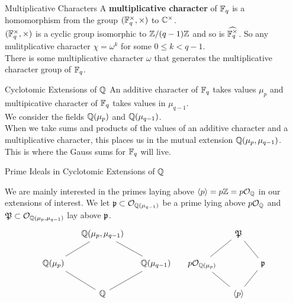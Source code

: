 \documentclass[presentation]{beamer}
\begin{document}
\begin{frame}{Multiplicative Characters}
A \textbf{multiplicative character} of $\mathbb{F}_q$ is a homomorphism from the group $(\mathbb{F}_q^\times, \times)$ to $\mathbb{C}^\times$. 
\\


$(\mathbb{F}_q^\times, \times)$ is a cyclic group isomorphic to $\mathbb{Z}/(q - 1)\mathbb{Z}$ and so is $\widehat{\mathbb{F}_q^\times}$. So any mulitplicative character $\chi = \omega^k$ for some $0 \leq k < q-1$.
\\


There is some multiplicative character $\omega$ that generates the multiplicative character group of $\mathbb{F}_q$.

\end{frame}

\begin{frame}{Cyclotomic Extensions of $\mathbb{Q}$}
An additive character of $\mathbb{F}_q$ takes values $\mu_p$ and multipicative character of $\mathbb{F}_q$ takes values in $\mu_{q-1}$.\\

We consider the fields $\mathbb{Q}(\mu_p)$ and $\mathbb{Q}(\mu_{q-1})$.
\\

When we take sums and products of the values of an additive character and a multiplicative character, this places us in the mutual extension $\mathbb{Q}(\mu_p, \mu_{q-1})$. 
\\
This is where the Gauss sums for $\mathbb{F}_q$ will live.


\end{frame}

\begin{frame}{Prime Ideals in Cyclotomic Extensions of $\mathbb{Q}$}

We are mainly interested in the primes laying above $\langle p \rangle = p\mathbb{Z} = p \mathcal{O}_{\mathbb{Q}}$ in our extensions of interest. We let $\mathfrak{p} \subset \mathcal{O}_{\mathbb{Q}(\mu_{q-1})}$ be a prime lying above $p\mathcal{O}_{\mathbb{Q}}$ and $\mathfrak{P} \subset \mathcal{O}_{\mathbb{Q}(\mu_p, \mu_{q-1})}$ lay above $\mathfrak{p}$.
\[\begin{tikzcd}[ampersand replacement=\&, column sep=small]
	\& {\mathbb{Q}(\mu_p,\mu_{q-1})} \&\&\& {\mathfrak{P}} \\
	{\mathbb{Q}(\mu_p)} \&\& {\mathbb{Q}(\mu_{q-1})} \& {p\mathcal{O}_{\mathbb{Q}(\mu_p)}} \&\& {\mathfrak{p}} \\
	\& {\mathbb{Q}} \&\&\& {\langle p \rangle}
	\arrow[no head, from=3-2, to=2-3]
	\arrow[no head, from=3-2, to=2-1]
	\arrow[no head, from=2-3, to=1-2]
	\arrow[no head, from=2-1, to=1-2]
	\arrow[no head, from=3-5, to=2-6]
	\arrow[no head, from=2-6, to=1-5]
	\arrow[no head, from=3-5, to=2-4]
	\arrow[no head, from=2-4, to=1-5]
\end{tikzcd}\]

\end{frame}
\end{document}
